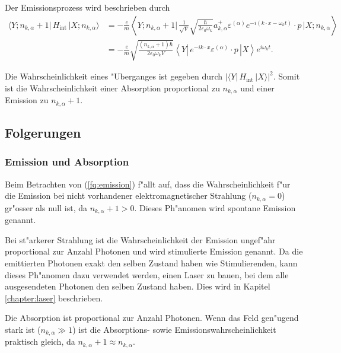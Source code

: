 \begin{refsection}
Der Emissionsprozess wird beschrieben durch
\begin{equation} \label{fq:emission}
\begin{split}
\langle Y; n_{k,\alpha} + 1 |\, H_{\text{int}} \,| X; n_{k,\alpha} \rangle &= 
-\frac{e}{m} \left\langle Y; n_{k,\alpha} + 1 \biggl| 
\, \frac{1}{\sqrt{V}} \sqrt{\frac{\hbar}{2 \varepsilon_0 \omega_k}}a^+_{k,\alpha} \varepsilon^{(\alpha)} e^{-i(k \cdot x-\omega_k t)} \cdot p \,
\biggl| X; n_{k,\alpha} \right\rangle\\
&= -\frac{e}{m} \sqrt{\frac{ (n_{k,\alpha}+1) \hbar}{2 \varepsilon_0 \omega_k V}} \left\langle Y \left| 
\, e^{-ik \cdot x} \varepsilon^{(\alpha)} \cdot p \,
\right| X \right\rangle e^{i\omega_k t}.
\end{split}
\end{equation}

Die Wahrscheinlichkeit eines "Uberganges ist gegeben durch $| \langle Y| \, H_{\text{int}} \, |X \rangle |^2$.
Somit ist die Wahrscheinlichkeit einer Absorption proportional zu $n_{k,\alpha}$ und einer Emission zu $n_{k,\alpha}+1$.

\subsection{Folgerungen}
\subsubsection{Emission und Absorption}
Beim Betrachten von (\ref{fq:emission}) f"allt auf, dass die Wahrscheinlichkeit f"ur die Emission bei nicht vorhandener elektromagnetischer Strahlung ($n_{k,\alpha} = 0$) gr"osser als null ist, da $n_{k,\alpha}+1 > 0$. Dieses Ph"anomen wird spontane Emission genannt.

Bei st"arkerer Strahlung ist die Wahrscheinlichkeit der Emission ungef"ahr proportional zur Anzahl Photonen und wird stimulierte Emission genannt. Da die emittierten Photonen exakt den selben Zustand haben wie Stimulierenden, kann dieses Ph"anomen dazu verwendet werden, einen Laser zu bauen, bei dem alle ausgesendeten Photonen den selben Zustand haben. Dies wird in Kapitel \ref{chapter:laser} beschrieben.

Die Absorption ist proportional zur Anzahl Photonen. Wenn das Feld gen"ugend stark ist ($n_{k,\alpha} \gg 1$) ist die Absorptions- sowie Emissionswahrscheinlichkeit praktisch gleich, da $n_{k,\alpha}+1 \approx n_{k,\alpha}$. 


\end{refsection}
